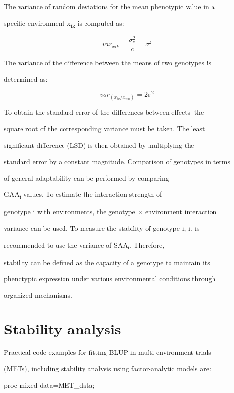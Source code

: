 \documentclass[10pt,twoside]{article}
\numberwithin{equation}{section}
\begin{document}
The variance of random deviations for the mean phenotypic value in a

specific environment x\textsubscript{ik} is computed as:



\[{var}_{xik} = \frac{\sigma_{e}^{2}}{c} = \sigma^{2}\]



The variance of the difference between the means of two genotypes is

determined as:



\[{var}_{(x_{ik}/x_{nm})} = 2\sigma^{2}\]



To obtain the standard error of the differences between effects, the

square root of the corresponding variance must be taken. The least

significant difference (LSD) is then obtained by multiplying the

standard error by a constant magnitude. Comparison of genotypes in terms

of general adaptability can be performed by comparing

GAA\textsubscript{i} values. To estimate the interaction strength of

genotype i with environments, the genotype × environment interaction

variance can be used. To measure the stability of genotype i, it is

recommended to use the variance of SAA\textsubscript{i}. Therefore,

stability can be defined as the capacity of a genotype to maintain its

phenotypic expression under various environmental conditions through

organized mechanisms.



\section{Stability analysis}



Practical code examples for fitting BLUP in multi-environment trials

(METs), including stability analysis using factor-analytic models are:



proc mixed data=MET\_data;
\end{document}
